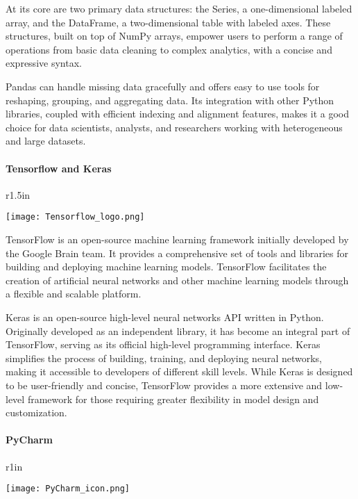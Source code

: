 At its core are two primary data structures: the Series, a one-dimensional labeled array, and the DataFrame, a two-dimensional table with labeled axes. These structures, built on top of NumPy arrays, empower users to perform a range of operations from basic data cleaning to complex analytics, with a concise and expressive syntax.

Pandas can handle missing data gracefully and offers easy to use tools for reshaping, grouping, and aggregating data. Its integration with other Python libraries, coupled with efficient indexing and alignment features, makes it a good choice for data scientists, analysts, and researchers working with heterogeneous and large datasets.

\paragraph*{Tensorflow and Keras} 

\begin{wrapfigure}{r}{1.5in}
\begin{center}
\texttt{[image: Tensorflow\_logo.png]}
\end{center}
\end{wrapfigure}

TensorFlow is an open-source machine learning framework initially developed by the Google Brain team. It provides a comprehensive set of tools and libraries for building and deploying machine learning models. TensorFlow facilitates the creation of artificial neural networks and other machine learning models through a flexible and scalable platform. 

Keras is an open-source high-level neural networks API written in Python. Originally developed as an independent library, it has become an integral part of TensorFlow, serving as its official high-level programming interface. Keras simplifies the process of building, training, and deploying neural networks, making it accessible to developers of different skill levels. While Keras is designed to be user-friendly and concise, TensorFlow provides a more extensive and low-level framework for those requiring greater flexibility in model design and customization. 

\paragraph*{PyCharm} 

\begin{wrapfigure}{r}{1in}
\begin{center}
\texttt{[image: PyCharm\_icon.png]}
\end{center}
\end{wrapfigure}

